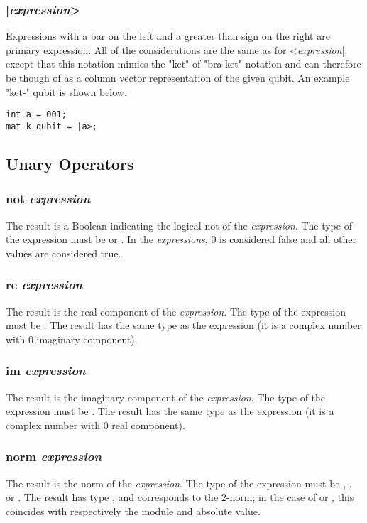 \subsubsection{|\textit{expression}>}
Expressions with a bar on the left and a greater than sign on the right are primary expression. All of the considerations are the same as for <\textit{expression}|, except that this notation mimics the "ket" of "bra-ket" notation and can therefore be though of as a column vector representation of the given qubit. An example "ket-" qubit is shown below.

\begin{lstlisting}
int a = 001;
mat k_qubit = |a>;
\end{lstlisting}

\subsection{Unary Operators}
\subsubsection{not \textit{expression}}
The result is a Boolean indicating the logical \textsf{not} of the \textit{expression}. The type of the expression must be \integ or \float. In the \textit{expressions}, 0 is considered false and all other values are considered true.
\subsubsection{re \textit{expression}}
The result is the real component of the \textit{expression}. The type of the expression must be  \complex. The result has the same type as the expression (it is a complex number with  0 imaginary component).
\subsubsection{im \textit{expression}}
The result is the imaginary component of the \textit{expression}. The type of the expression must be  \complex. The result has the same type as the expression (it is a complex number with  0 real component).
\subsubsection{norm \textit{expression}}
The result is the norm of the \textit{expression}. The type of the expression must be \mat, \complex, or \float. The result has type \float, and corresponds to the $2$-norm; in the case of \complex or \float, this coincides with respectively the module and absolute value.
